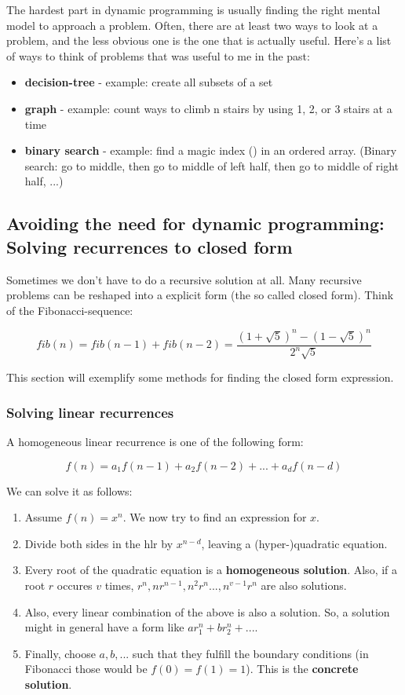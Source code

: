 The hardest part in dynamic programming is usually finding the right mental model to approach a problem. Often, there are at least two ways to look at a problem, and the less obvious one is the one that is actually useful.
Here's a list of ways to think of problems that was useful to me in the past:
\begin{itemize}
  \item \textbf{decision-tree} - example: create all subsets of a set
  \item \textbf{graph} - example: count ways to climb n stairs by using 1, 2, or 3 stairs at a time
  \item \textbf{binary search} - example: find a magic index () in an ordered array. (Binary search: go to middle, then go to middle of left half, then go to middle of right half, ...)
\end{itemize}


\subsection{Avoiding the need for dynamic programming: Solving recurrences to closed form}
Sometimes we don't have to do a recursive solution at all. Many recursive problems can be reshaped into a explicit form (the so called closed form). Think of the Fibonacci-sequence: 

$$ fib(n) = fib(n-1) + fib(n-2) = \frac{(1 + \sqrt{5})^n - (1 - \sqrt{5})^n }{2^n \sqrt{5}} $$

This section will exemplify some methods for finding the closed form expression.

\subsubsection{Solving linear recurrences}

A homogeneous linear recurrence is one of the following form: 

$$ f(n) = a_1 f(n-1) + a_2 f(n-2) + ... + a_d f(n-d)$$

We can solve it as follows: 

\begin{enumerate}
    \item Assume $f(n) = x^n$. We now try to find an expression for $x$.
    \item Divide both sides in the hlr by $x^{n-d}$, leaving a (hyper-)quadratic equation. 
    \item Every root of the quadratic equation is a \textbf{homogeneous solution}. Also, if a root $r$ occures $v$ times, $r^n, nr^{n-1}, n^2r^n ..., n^{v-1}r^n$ are also solutions.
    \item Also, every linear combination of the above is also a solution. So, a solution might in general have a form like $a r_1^n + b r_2^n + ...$.
    \item Finally, choose $a, b, ...$ such that they fulfill the boundary conditions (in Fibonacci those would be $f(0) = f(1) = 1$). This is the \textbf{concrete solution}.
\end{enumerate}

